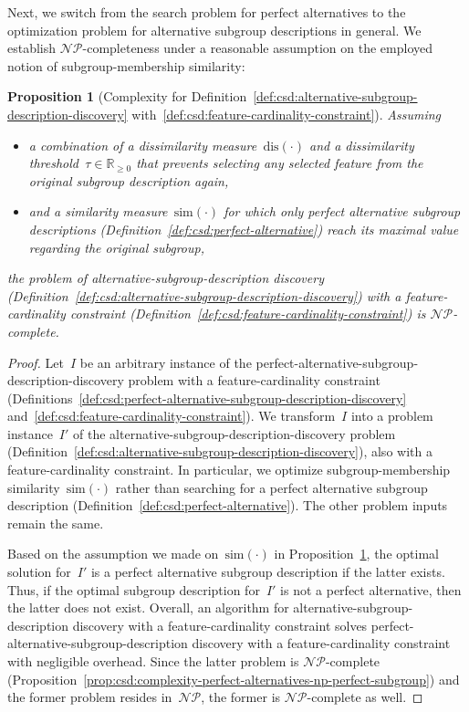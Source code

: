 \documentclass[acmsmall]{acmart} %
\theoremstyle{acmplain}
\newtheorem{proposition}{Proposition}
\theoremstyle{acmdefinition}
\begin{document}
Next, we switch from the search problem for perfect alternatives to the optimization problem for alternative subgroup descriptions in general.
We establish $\mathcal{NP}$-completeness under a reasonable assumption on the employed notion of subgroup-membership similarity:
%
\begin{proposition}[Complexity for Definition~\ref{def:csd:alternative-subgroup-description-discovery} with~\ref{def:csd:feature-cardinality-constraint}]
	Assuming
	\begin{itemize}[noitemsep]
		\item a combination of a dissimilarity measure~$\text{dis}(\cdot)$ and a dissimilarity threshold~$\tau \in \mathbb{R}_{\geq 0}$ that prevents selecting any selected feature from the original subgroup description again,
		\item and a similarity measure~$\text{sim}(\cdot)$ for which only perfect alternative subgroup descriptions (Definition~\ref{def:csd:perfect-alternative}) reach its maximal value regarding the original subgroup,
	\end{itemize}
	the problem of alternative-subgroup-description discovery (Definition~\ref{def:csd:alternative-subgroup-description-discovery}) with a feature-cardinality constraint (Definition~\ref{def:csd:feature-cardinality-constraint}) is $\mathcal{NP}$-complete.
	\label{prop:csd:complexity-alternatives-np}
\end{proposition}
%
\begin{proof}
	Let~$I$ be an arbitrary instance of the perfect-alternative-subgroup-description-discovery problem with a feature-cardinality constraint (Definitions~\ref{def:csd:perfect-alternative-subgroup-description-discovery} and~\ref{def:csd:feature-cardinality-constraint}).
	We transform~$I$ into a problem instance~$I'$ of the alternative-subgroup-description-discovery problem (Definition~\ref{def:csd:alternative-subgroup-description-discovery}), also with a feature-cardinality constraint.
	In particular, we optimize subgroup-membership similarity~$\text{sim}(\cdot)$ rather than searching for a perfect alternative subgroup description (Definition~\ref{def:csd:perfect-alternative}).
	The other problem inputs remain the same.
	
	Based on the assumption we made on~$\text{sim}(\cdot)$ in Proposition~\ref{prop:csd:complexity-alternatives-np}, the optimal solution for~$I'$ is a perfect alternative subgroup description if the latter exists.
	Thus, if the optimal subgroup description for~$I'$ is not a perfect alternative, then the latter does not exist.
	Overall, an algorithm for alternative-subgroup-description discovery with a feature-cardinality constraint solves perfect-alternative-subgroup-description discovery with a feature-cardinality constraint with negligible overhead.
	Since the latter problem is $\mathcal{NP}$-complete (Proposition~\ref{prop:csd:complexity-perfect-alternatives-np-perfect-subgroup}) and the former problem resides in~$\mathcal{NP}$, the former is $\mathcal{NP}$-complete as well.
\end{proof}
\end{document}
